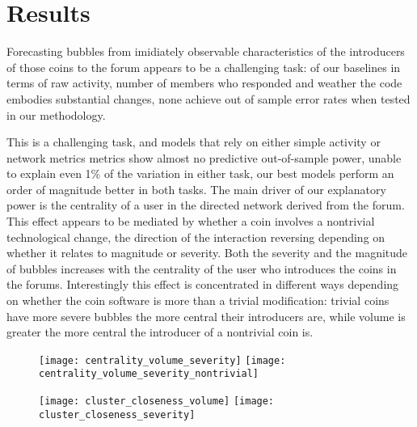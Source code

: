 \section{Results}


Forecasting bubbles from imidiately observable characteristics of the introducers of those coins to the forum appears to be a challenging task: of our baselines in terms of raw activity, number of members who responded and weather the code embodies substantial changes, none achieve out of sample error rates when tested in our methodology.

This is a challenging task, and models that rely on either simple activity or network metrics metrics show almost no predictive out-of-sample power, unable to explain even 1\% of the variation in either task,
our best models perform an order of magnitude better in both tasks.
The main driver of our explanatory power is the centrality of a user in the directed network derived from the forum. 
This effect appears to be mediated by whether a coin involves a nontrivial technological change, the direction of the interaction reversing depending on whether it relates to magnitude or severity.
Both the severity and the magnitude of bubbles increases with the centrality of the user who introduces the coins in the forums.  
Interestingly this effect is concentrated in different ways depending on whether the coin software is more than a trivial modification: trivial coins have more severe bubbles the more central their introducers are, while volume is greater the more central the introducer of a nontrivial coin is.




\begin{figure}[h]
\texttt{[image: centrality\_volume\_severity]}
\texttt{[image: centrality\_volume\_severity\_nontrivial]}
\end{figure}




\begin{figure}[h]
\texttt{[image: cluster\_closeness\_volume]}
\texttt{[image: cluster\_closeness\_severity]}
\end{figure}

